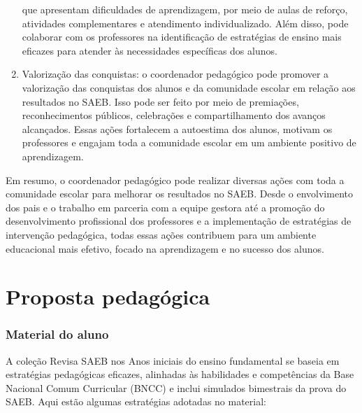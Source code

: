 \begin{enumerate}
  que apresentam dificuldades de aprendizagem, por meio de aulas de
  reforço, atividades complementares e atendimento individualizado. Além
  disso, pode colaborar com os professores na identificação de
  estratégias de ensino mais eficazes para atender às necessidades
  específicas dos alunos.
\item
  Valorização das conquistas: o coordenador pedagógico pode promover a
  valorização das conquistas dos alunos e da comunidade escolar em
  relação aos resultados no SAEB. Isso pode ser feito por meio de
  premiações, reconhecimentos públicos, celebrações e compartilhamento
  dos avanços alcançados. Essas ações fortalecem a autoestima dos
  alunos, motivam os professores e engajam toda a comunidade escolar em
  um ambiente positivo de aprendizagem.
\end{enumerate}

Em resumo, o coordenador pedagógico pode realizar diversas ações com
toda a comunidade escolar para melhorar os resultados no SAEB. Desde o
envolvimento dos pais e o trabalho em parceria com a equipe gestora até
a promoção do desenvolvimento profissional dos professores e a
implementação de estratégias de intervenção pedagógica, todas essas
ações contribuem para um ambiente educacional mais efetivo, focado na
aprendizagem e no sucesso dos alunos.

\section{Proposta pedagógica}

\subsubsection{Material do aluno}\label{material-do-aluno}

A coleção Revisa SAEB nos Anos iniciais do ensino fundamental se baseia
em estratégias pedagógicas eficazes, alinhadas às habilidades e
competências da Base Nacional Comum Curricular (BNCC) e inclui simulados
bimestrais da prova do SAEB. Aqui estão algumas estratégias adotadas no
material:

